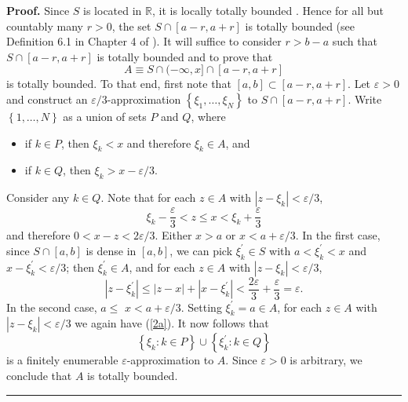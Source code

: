 \documentclass[11pt]{article}%
\newenvironment{proof}[1][Proof]{\noindent\textbf{#1.} }{\ \rule{0.5em}{0.5em}}
\begin{document}
\begin{proof}
Since $S$ is located in $\mathbb{R}$, it is locally totally bounded
\cite[2.2.18]{bv}. Hence for all but countably many $r>0$, the set
$S\cap\left[  a-r,a+r\right]  $ is totally bounded (see Definition 6.1 in
Chapter 4 of \cite{BB}). It will suffice to consider $r>b-a$ such that
$S\cap\left[  a-r,a+r\right]  $ is totally bounded and to prove that%
\[
A\equiv S\cap(-\infty,x]\cap\left[  a-r,a+r\right]
\]
is totally bounded. To that end, first note that $\left[  a,b\right]
\subset\left[  a-r,a+r\right]  $. Let $\varepsilon>0$ and construct an
$\varepsilon/3$-approximation $\left\{  \xi_{1},\ldots,\xi_{N}\right\}  $ to
$S\cap\left[  a-r,a+r\right]  $. Write $\left\{  1,\ldots,N\right\}  $ as a
union of sets $P$ and $Q$, where

\begin{itemize}
\item[--] if $k\in P$, then $\xi_{k}<x$ and therefore $\xi_{k}\in A$, and

\item[--] if $k\in Q$, then $\xi_{k}>x-\varepsilon/3$.
\end{itemize}

%

\noindent
Consider any $k\in Q$. Note that for each $z\in A$ with $\left\vert z-\xi
_{k}\right\vert <\varepsilon/3$,
\[
\xi_{k}-\frac{\varepsilon}{3}<z\leq x<\xi_{k}+\frac{\varepsilon}{3}%
\]
and therefore $0<x-z<2\varepsilon/3$. Either $x>a$ or $x<a+\varepsilon/3$. In
the first case, since $S\cap\left[  a,b\right]  $ is dense in $\left[
a,b\right]  $, we can pick $\xi_{k}^{\prime}\in S$ with $a<\xi_{k}^{\prime}<x
$ and $x-\xi_{k}^{\prime}<\varepsilon/3$; then $\xi_{k}^{\prime}\in A$, and
for each $z\in A$ with $\left\vert z-\xi_{k}\right\vert <\varepsilon/3$,%
\begin{equation}
\left\vert z-\xi_{k}^{\prime}\right\vert \leq\left\vert z-x\right\vert
+\left\vert x-\xi_{k}^{\prime}\right\vert <\frac{2\varepsilon}{3}%
+\frac{\varepsilon}{3}=\varepsilon. \label{2a}%
\end{equation}
In the second case, $a\leq$ $x<a+\varepsilon/3$. Setting $\xi_{k}^{\prime
}=a\in A$, for each $z\in A$ with $\left\vert z-\xi_{k}\right\vert
<\varepsilon/3$ we again have (\ref{2a}). It now follows that
\[
\left\{  \xi_{k}:k\in P\right\}  \cup\left\{  \xi_{k}^{\prime}:k\in Q\right\}
\]
is a finitely enumerable $\varepsilon$-approximation to $A$. Since
$\varepsilon>0$ is arbitrary, we conclude that $A$ is totally bounded.
\end{proof}
\end{document}
